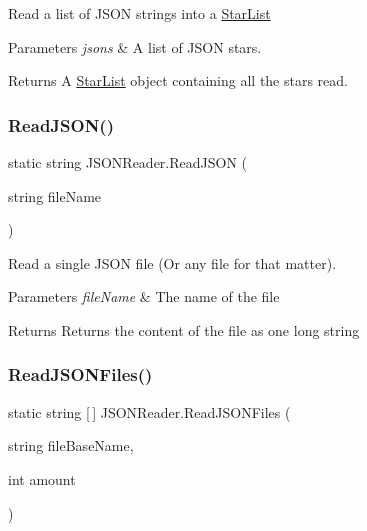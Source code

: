Read a list of J\+S\+ON strings into a \mbox{\hyperlink{class_star_list}{Star\+List}} 


\begin{DoxyParams}{Parameters}
{\em jsons} & A list of J\+S\+ON stars.\\
\hline
\end{DoxyParams}
\begin{DoxyReturn}{Returns}
A \mbox{\hyperlink{class_star_list}{Star\+List}} object containing all the stars read.
\end{DoxyReturn}
\mbox{\label{class_j_s_o_n_reader_a9b5c860661574454a2d498ec224a1809}} 
\subsubsection{\texorpdfstring{ReadJSON()}{ReadJSON()}}
{\footnotesize\ttfamily static string J\+S\+O\+N\+Reader.\+Read\+J\+S\+ON (\begin{DoxyParamCaption}\item[{string}]{file\+Name }\end{DoxyParamCaption})\hspace{0.3cm}{\ttfamily [static]}}



Read a single J\+S\+ON file (Or any file for that matter). 


\begin{DoxyParams}{Parameters}
{\em file\+Name} & The name of the file\\
\hline
\end{DoxyParams}
\begin{DoxyReturn}{Returns}
Returns the content of the file as one long string
\end{DoxyReturn}
\mbox{\label{class_j_s_o_n_reader_a3995d1ee97e2755b0fcc97700e5253af}} 
\subsubsection{\texorpdfstring{ReadJSONFiles()}{ReadJSONFiles()}}
{\footnotesize\ttfamily static string \mbox{[}$\,$\mbox{]} J\+S\+O\+N\+Reader.\+Read\+J\+S\+O\+N\+Files (\begin{DoxyParamCaption}\item[{string}]{file\+Base\+Name,  }\item[{int}]{amount }\end{DoxyParamCaption})\hspace{0.3cm}{\ttfamily [static]}}



